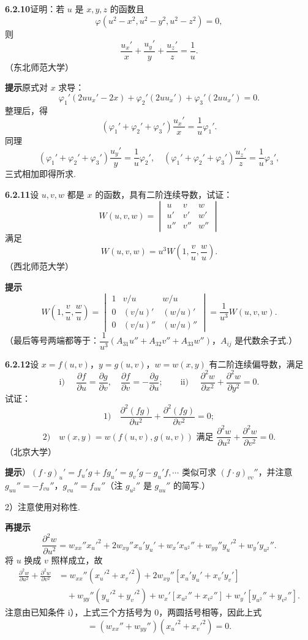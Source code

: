 \documentclass[UTF8,12pt,a4paper,fontset=fandol]{ctexart}
\begin{document}
\noindent\textbf{6.2.10}\quad 证明：若 $u$ 是 $x,y,z$ 的函数且
\[
  \varphi(u^2-x^2,u^2-y^2,u^2-z^2)=0,
\]
则
\[
  \frac{u_x'}x+\frac{u_y'}y+\frac{u_z'}z=\frac1u.
\]
（东北师范大学）

\noindent\textbf{提示}\quad 原式对 $x$ 求导：
\[
  \varphi_1'(2uu_x'-2x)+\varphi_2'(2uu_x')+\varphi_3'(2uu_x')=0.
\]
整理后，得
\[
  (\varphi_1'+\varphi_2'+\varphi_3')\frac{u_x'}x=\frac1u\varphi_1'.
\]
同理
\[
  (\varphi_1'+\varphi_2'+\varphi_3')\frac{u_y'}y=\frac1u\varphi_2',\quad
  (\varphi_1'+\varphi_2'+\varphi_3')\frac{u_z'}z=\frac1u\varphi_3',
\]
三式相加即得所求.

\noindent\textbf{6.2.11}\quad 设 $u,v,w$ 都是 $x$ 的函数，具有二阶连续导数，试证：
\[
  W(u,v,w)=
  \begin{vmatrix}
  u&v&w\\
  u'&v'&w'\\
  u''&v''&w''
  \end{vmatrix}
\]
满足
\[
  W(u,v,w)=u^3W\left(1,\frac vu,\frac wu\right).
\]
（西北师范大学）

\noindent\textbf{提示}\quad
\[
  W\left(1,\frac vu,\frac wu\right)=
  \begin{vmatrix}
  1&v/u&w/u\\
  0&(v/u)'&(w/u)'\\
  0&(v/u)''&(w/u)''
  \end{vmatrix}
  =\frac1{u^3}W(u,v,w).
\]
（最后等号两端都等于：$\dfrac1{u^3}(A_{31}u''+A_{32}v''+A_{33}w'')$，$A_{ij}$ 是代数余子式.）

\noindent\textbf{6.2.12}\quad 设 $x=f(u,v)$，$y=g(u,v)$，$w=w(x,y)$ 有二阶连续偏导数，满足
\[
  \text{i) }\quad \frac{\partial f}{\partial u}=\frac{\partial g}{\partial v},\quad
  \frac{\partial f}{\partial v}=-\frac{\partial g}{\partial u};
  \qquad
  \text{ii) }\quad
  \frac{\partial^2w}{\partial x^2}+\frac{\partial^2w}{\partial y^2}=0.
\]
试证：
\[
  1)\quad \frac{\partial^2(fg)}{\partial u^2}+\frac{\partial^2(fg)}{\partial v^2}=0;
\]
\[
  2)\quad w(x,y)=w(f(u,v),g(u,v))\text{ 满足 }
  \frac{\partial^2w}{\partial u^2}+\frac{\partial^2w}{\partial v^2}=0.
\]
（北京大学）

\noindent\textbf{提示}）$(f\cdot g)_u'=f_u'g+fg_u'=g_v'g-g_u'f,\cdots$ 类似可求 $(f\cdot g)_{vv}''$，并注意 $g_{uu}''=-f_{vu}''$，$g_{vu}''=f_{uu}''$（注 $g_{u^2}''$ 是 $g_{uu}''$ 的简写.）

2）注意使用对称性.

\noindent\textbf{再提示}\quad
\[
  \frac{\partial^2w}{\partial u^2}
  =w_{xx}''x_u'^2+2w_{xy}''x_u'y_u'+w_x'x_{u^2}''
  +w_{yy}''y_u'^2+w_y'y_{u^2}''.
\]
将 $u$ 换成 $v$ 照样成立，故
\[
\begin{aligned}
\frac{\partial^2w}{\partial u^2}+\frac{\partial^2w}{\partial v^2}
&=w_{xx}''(x_u'^2+x_v'^2)+2w_{xy}''[x_u'y_u'+x_v'y_v']\\
&\quad+w_{yy}''(y_u'^2+y_v'^2)+w_x'[x_{u^2}''+x_{v^2}'']
+w_y'[y_{u^2}''+y_{v^2}''].
\end{aligned}
\]
注意由已知条件 i），上式三个方括号为 $0$，两圆括号相等，因此上式
\[
  =(w_{xx}''+w_{yy}'')(x_u'^2+x_v'^2)=0.
\]
\end{document}

